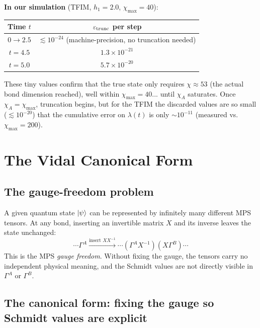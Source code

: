 \documentclass[11pt, a4paper]{article}
\begin{document}
\textbf{In our simulation} (TFIM, $h_1 = 2.0$, $\chi_{\max} = 40$):
\begin{center}
\begin{tabular}{cc}
\toprule
Time $t$ & $\varepsilon_{\rm trunc}$ per step \\
\midrule
$0 \to 2.5$ & $\lesssim 10^{-24}$ (machine-precision, no truncation needed) \\
$t = 4.5$   & $1.3 \times 10^{-21}$ \\
$t = 5.0$   & $5.7 \times 10^{-20}$ \\
\bottomrule
\end{tabular}
\end{center}
These tiny values confirm that the true state only requires $\chi \approx 53$ (the actual bond dimension reached), well within $\chi_{\max} = 40$... until $\chi_A$ saturates. Once $\chi_A = \chi_{\max}$, truncation begins, but for the TFIM the discarded values are so small ($\lesssim 10^{-20}$) that the cumulative error on $\lambda(t)$ is only $\sim 10^{-11}$ (measured vs.\ $\chi_{\max} = 200$).

\section{The Vidal Canonical Form}
\label{sec:vidal}

\subsection{The gauge-freedom problem}

A given quantum state $\ket{\psi}$ can be represented by infinitely many different MPS tensors. At any bond, inserting an invertible matrix $X$ and its inverse leaves the state unchanged:
\begin{equation}
  \cdots \Gamma^A \xrightarrow{\text{insert } X X^{-1}} \cdots (\Gamma^A X^{-1})(X \Gamma^B) \cdots
\end{equation}
This is the MPS \emph{gauge freedom}. Without fixing the gauge, the tensors carry no independent physical meaning, and the Schmidt values are not directly visible in $\Gamma^A$ or $\Gamma^B$.

\subsection{The canonical form: fixing the gauge so Schmidt values are explicit}
\end{document}
